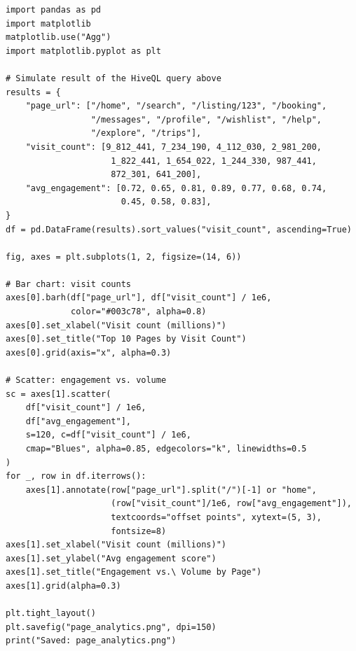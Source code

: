 \begin{lstlisting}[style=pyspark, caption={PE7.3b: Visualise URL frequency from Hive results}]
import pandas as pd
import matplotlib
matplotlib.use("Agg")
import matplotlib.pyplot as plt

# Simulate result of the HiveQL query above
results = {
    "page_url": ["/home", "/search", "/listing/123", "/booking",
                 "/messages", "/profile", "/wishlist", "/help",
                 "/explore", "/trips"],
    "visit_count": [9_812_441, 7_234_190, 4_112_030, 2_981_200,
                     1_822_441, 1_654_022, 1_244_330, 987_441,
                     872_301, 641_200],
    "avg_engagement": [0.72, 0.65, 0.81, 0.89, 0.77, 0.68, 0.74,
                       0.45, 0.58, 0.83],
}
df = pd.DataFrame(results).sort_values("visit_count", ascending=True)

fig, axes = plt.subplots(1, 2, figsize=(14, 6))

# Bar chart: visit counts
axes[0].barh(df["page_url"], df["visit_count"] / 1e6,
             color="#003c78", alpha=0.8)
axes[0].set_xlabel("Visit count (millions)")
axes[0].set_title("Top 10 Pages by Visit Count")
axes[0].grid(axis="x", alpha=0.3)

# Scatter: engagement vs. volume
sc = axes[1].scatter(
    df["visit_count"] / 1e6,
    df["avg_engagement"],
    s=120, c=df["visit_count"] / 1e6,
    cmap="Blues", alpha=0.85, edgecolors="k", linewidths=0.5
)
for _, row in df.iterrows():
    axes[1].annotate(row["page_url"].split("/")[-1] or "home",
                     (row["visit_count"]/1e6, row["avg_engagement"]),
                     textcoords="offset points", xytext=(5, 3),
                     fontsize=8)
axes[1].set_xlabel("Visit count (millions)")
axes[1].set_ylabel("Avg engagement score")
axes[1].set_title("Engagement vs.\ Volume by Page")
axes[1].grid(alpha=0.3)

plt.tight_layout()
plt.savefig("page_analytics.png", dpi=150)
print("Saved: page_analytics.png")
\end{lstlisting}
